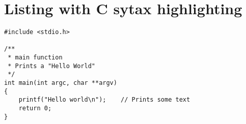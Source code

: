 \section{Listing with C sytax highlighting}
\begin{lstlisting}
#include <stdio.h>

/**
 * main function
 * Prints a "Hello World"
 */
int main(int argc, char **argv)
{
    printf("Hello world\n");    // Prints some text
    return 0;
}
\end{lstlisting}
